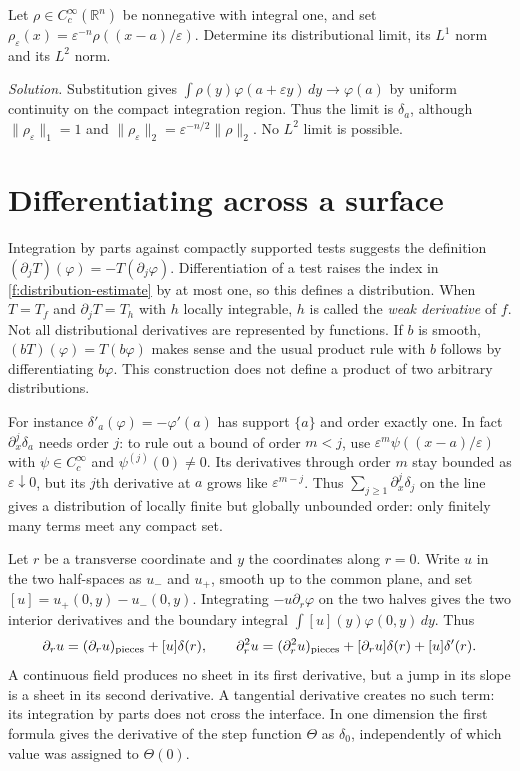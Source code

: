 \begin{exercise}
Let $\rho\in C_c^\infty(\mathbb R^n)$ be nonnegative with integral one, and set $\rho_\varepsilon(x)=\varepsilon^{-n}\rho((x-a)/\varepsilon)$. Determine its distributional limit, its $L^1$ norm and its $L^2$ norm.
\end{exercise}
\noindent\emph{Solution.} Substitution gives $\int\rho(y)\varphi(a+\varepsilon y)\,dy\to\varphi(a)$ by uniform continuity on the compact integration region. Thus the limit is $\delta_a$, although $\|\rho_\varepsilon\|_1=1$ and $\|\rho_\varepsilon\|_2=\varepsilon^{-n/2}\|\rho\|_2$. No $L^2$ limit is possible.

\section{Differentiating across a surface}\label{f:jump-derivative}

Integration by parts against compactly supported tests suggests the definition $(\partial_j T)(\varphi)=-T(\partial_j\varphi)$. Differentiation of a test raises the index in \eqref{f:distribution-estimate} by at most one, so this defines a distribution. When $T=T_f$ and $\partial_j T=T_h$ with $h$ locally integrable, $h$ is called the \emph{weak derivative} of $f$. Not all distributional derivatives are represented by functions. If $b$ is smooth, $(bT)(\varphi)=T(b\varphi)$ makes sense and the usual product rule with $b$ follows by differentiating $b\varphi$. This construction does not define a product of two arbitrary distributions.

For instance $\delta'_a(\varphi)=-\varphi'(a)$ has support $\{a\}$ and order exactly one. In fact $\partial_x^j\delta_a$ needs order $j$: to rule out a bound of order $m<j$, use $\varepsilon^m\psi((x-a)/\varepsilon)$ with $\psi\in C_c^\infty$ and $\psi^{(j)}(0)\ne0$. Its derivatives through order $m$ stay bounded as $\varepsilon\downarrow0$, but its $j$th derivative at $a$ grows like $\varepsilon^{m-j}$. Thus $\sum_{j\geq1}\partial_x^j\delta_j$ on the line gives a distribution of locally finite but globally unbounded order: only finitely many terms meet any compact set.

Let $r$ be a transverse coordinate and $y$ the coordinates along $r=0$. Write $u$ in the two half-spaces as $u_-$ and $u_+$, smooth up to the common plane, and set $[u]=u_+(0,y)-u_-(0,y)$. Integrating $-u\partial_r\varphi$ on the two halves gives the two interior derivatives and the boundary integral $\int [u](y)\varphi(0,y)\,dy$. Thus
\begin{equation}
 \partial_r u=(\partial_r u)_{\rm pieces}+[u]\delta(r),\qquad
 \partial_r^2 u=(\partial_r^2 u)_{\rm pieces}+[\partial_r u]\delta(r)+[u]\delta'(r).
 \label{f:jump-formula}
\end{equation}
A continuous field produces no sheet in its first derivative, but a jump in its slope is a sheet in its second derivative. A tangential derivative creates no such term: its integration by parts does not cross the interface. In one dimension the first formula gives the derivative of the step function $\Theta$ as $\delta_0$, independently of which value was assigned to $\Theta(0)$.

